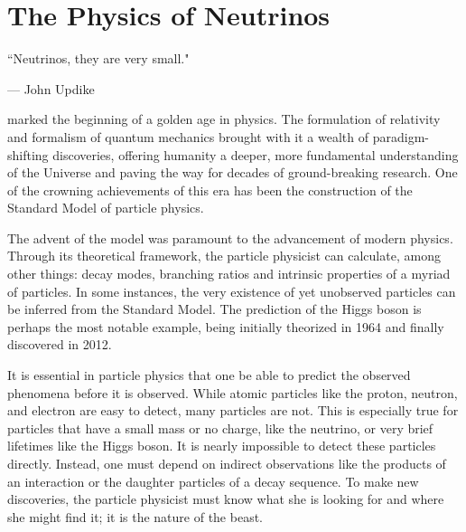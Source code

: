 %
%
%
%


\chapter{The Physics of Neutrinos}
	\label{neutrino_physics_chapter}

	\vspace{-0.2in}

	\begin{quoting}
		\noindent \large ``Neutrinos, they are very small." \normalsize

		--- John Updike
	\end{quoting}

	 marked the beginning of a golden age in physics. The formulation of relativity and formalism of quantum mechanics brought with it a wealth of paradigm-shifting discoveries, offering humanity a deeper, more fundamental understanding of the Universe and paving the way for decades of ground-breaking research. One of the crowning achievements of this era has been the construction of the Standard Model of particle physics.

	The advent of the model was paramount to the advancement of modern physics. Through its theoretical framework, the particle physicist can calculate, among other things: decay modes, branching ratios and intrinsic properties of a myriad of particles. In some instances, the very existence of yet unobserved particles can be inferred from the Standard Model. The prediction of the Higgs boson is perhaps the most notable example, being initially theorized in 1964\cite{higgsTheory} and finally discovered in 2012\cite{higgsCMS,higgsATLAS}.

	It is essential in particle physics that one be able to predict the observed phenomena before it is observed. While atomic particles like the proton, neutron, and electron are easy to detect, many particles are not. This is especially true for particles that have a small mass or no charge, like the neutrino, or very brief lifetimes like the Higgs boson. It is nearly impossible to detect these particles directly. Instead, one must depend on indirect observations like the products of an interaction or the daughter particles of a decay sequence. To make new discoveries, the particle physicist must know what she is looking for and where she might find it; it is the nature of the beast. 

